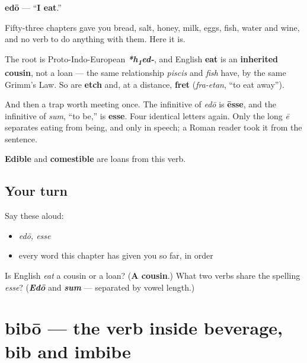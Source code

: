 \begin{cousinweb}
\textbf{edō} — \textquotedblleft{}\textbf{I eat}.\textquotedblright{}

Fifty-three chapters gave you bread, salt, honey, milk, eggs, fish, water and wine, and no verb to do anything with them. Here it is.

The root is Proto-Indo-European \emph{\textbf{*h\textsubscript{1}ed-}}, and English \textbf{eat} is an \textbf{inherited cousin}, not a loan — the same relationship \emph{piscis} and \emph{fish} have, by the same Grimm's Law. So are \textbf{etch} and, at a distance, \textbf{fret} (\emph{fra-etan}, \textquotedblleft{}to eat away\textquotedblright{}).

And then a trap worth meeting once. The infinitive of \emph{edō} is \textbf{ēsse}, and the infinitive of \emph{sum}, \textquotedblleft{}to be,\textquotedblright{} is \textbf{esse}. Four identical letters again. Only the long \emph{ē} separates eating from being, and only in speech; a Roman reader took it from the sentence.

\textbf{Edible} and \textbf{comestible} are loans from this verb.
\end{cousinweb}

\subsection*{Your turn}
Say these aloud:

\begin{itemize}
\raggedright
  \item \emph{edō, esse}
  \item every word this chapter has given you so far, in order
\end{itemize}

\begin{tcolorbox}[breakable,colback=teal!4,colframe=teal!35!black,title={Before you move on}]
Is English \emph{eat} a cousin or a loan? (\textbf{A cousin}.) What two verbs share the spelling \emph{esse}? (\emph{\textbf{Edō}} and \emph{\textbf{sum}} — separated by vowel length.)
\end{tcolorbox}
\section[bibō, bibere]{bibō — the verb inside beverage, bib and imbibe}

\label{lesson:LA-C54-bibo}




